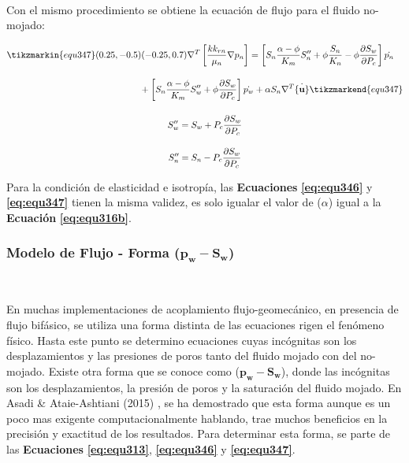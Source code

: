\\
Con el mismo procedimiento se obtiene la ecuación de flujo para el fluido no-mojado:
\\
\begin{ceqn} 
\begin{subequations} \label{eq:equ347} 
\begin{gather}
\begin{multlined}
\tikzmarkin{equ347}(0.25,-0.5)(-0.25,0.7)
\nabla^T \left[\frac{k k_{rn}}{\mu_{n}}\nabla p_n\right] = \left[S_n \frac{\alpha - \phi}{K_m}S''_n + \phi\frac{S_n}{K_n} - \phi\frac{\partial S_w}{\partial P_c}\right]\dot{p_n} \\[10pt]
+ \left[S_n \frac{\alpha - \phi}{K_m}S''_w + \phi\frac{\partial S_w}{\partial P_c}\right]\dot{p_w} +\alpha S_n \nabla^T \dot{\{\mathbf{u}\}} \tikzmarkend{equ347} \label{eq:equ347a}
\end{multlined}\\[12pt]
S''_w = S_w + P_c\frac{\partial S_w}{\partial P_c}  \label{eq:equ347b}\\[10pt]
S''_n = S_n - P_c\frac{\partial S_w}{\partial P_c}  \label{eq:equ347c}
\end{gather}  
\end{subequations} 
\end{ceqn}

Para la condición de elasticidad e isotropía, las \textbf{Ecuaciones} \textbf{\ref{eq:equ346}} y \textbf{\ref{eq:equ347}} tienen la misma validez, es solo igualar el valor de ($\alpha$) igual a la \textbf{Ecuación} \textbf{\ref{eq:equ316b}}.
\bigskip


\subsubsection{Modelo de Flujo - Forma ($\mathbf{p_w-S_w}$)}~\hypertarget{sec:sec3323}{}
\label{sec:sec3323}

En muchas implementaciones de acoplamiento flujo-geomecánico, en presencia de flujo bifásico, se utiliza una forma distinta de las ecuaciones rigen el fenómeno físico. Hasta este punto se determino ecuaciones cuyas incógnitas son los desplazamientos y las presiones de poros tanto del fluido mojado con del no-mojado. Existe otra forma que se conoce como ($\mathbf{p_w-S_w}$), donde las incógnitas son los desplazamientos, la presión de poros y la saturación del fluido mojado. En Asadi \& Ataie-Ashtiani (2015) \cite{Asadi2015}, se ha demostrado que esta forma aunque es un poco mas exigente computacionalmente hablando, trae muchos beneficios en la precisión y exactitud de los resultados. Para determinar esta forma, se parte de las \textbf{Ecuaciones} \textbf{\ref{eq:equ313}}, \textbf{\ref{eq:equ346}} y \textbf{\ref{eq:equ347}}.



